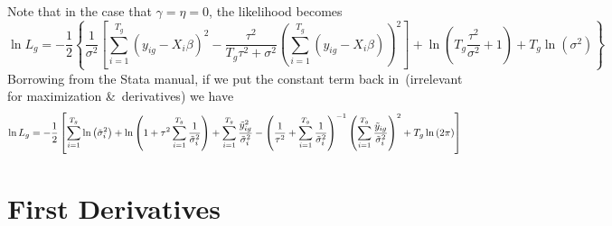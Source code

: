 \documentclass[12pt]{article}
\begin{document}
Note that in the case that $\gamma =\eta =0$, the likelihood becomes%
\[
\ln L_{g}=-\frac{1}{2}\left\{ \frac{1}{\sigma ^{2}}\left[ \sum_{i=1}^{T_{g}}%
\left( y_{ig}-X_{i}\beta \right) ^{2}-\frac{\tau ^{2}}{T_{g}\tau ^{2}+\sigma
^{2}}\left( \sum_{i=1}^{T_{g}}\left( y_{ig}-X_{i}\beta \right) \right) ^{2}%
\right] +\ln \left( T_{g}\frac{\tau ^{2}}{\sigma ^{2}}+1\right) +T_{g}\ln
\left( \sigma ^{2}\right) \right\} 
\]%
Borrowing from the Stata manual, if we put the constant term back in\
(irrelevant for maximization \&\ derivatives) we have%
\[
\ln L_{g}=-\frac{1}{2}\left[ \sum_{i=1}^{T_{g}}\ln \left( \tilde{\sigma}%
_{i}^{2}\right) +\ln \left( 1+\tau ^{2}\sum_{i=1}^{T_{g}}\frac{1}{\tilde{%
\sigma}_{i}^{2}}\right) +\sum_{i=1}^{T_{g}}\frac{\tilde{y}_{ig}^{2}}{\tilde{%
\sigma}_{i}^{2}}-\left( \frac{1}{\tau ^{2}}+\sum_{i=1}^{T_{g}}\frac{1}{%
\tilde{\sigma}_{i}^{2}}\right) ^{-1}\left( \sum_{i=1}^{T_{g}}\frac{\tilde{y}%
_{ig}}{\tilde{\sigma}_{i}^{2}}\right) ^{2}+T_{g}\ln \left( 2\pi \right) %
\right] 
\]

\section{First Derivatives}
\end{document}
